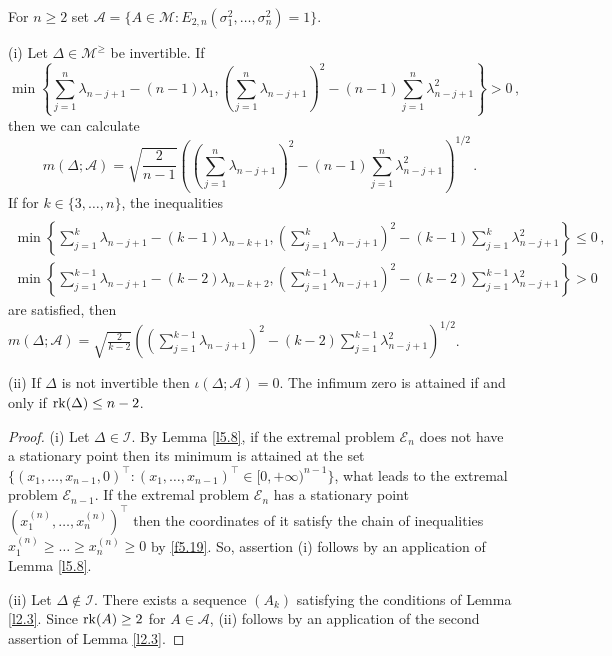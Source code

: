 \documentclass{amsart}
\begin{document}
For $n \geq 2$ set ${\mathcal A} = \{ A \in {\mathcal M}: E_{2,n}(\sigma_1^2, \ldots , \sigma_n^2)=1 \}$.                                    

\begin{pro} \label{p5.9}
(i) Let $\Delta \in {\mathcal M}^\geq$ be invertible. If 
\[
\min \left\{ \sum_{j=1}^n \lambda_{n-j+1} - (n-1)\lambda_1, \left( \sum_{j=1}^n \lambda_{n-j+1}\right)^2 - (n-1) \sum_{j=1}^n \lambda_{n-j+1}^2 \right\} >0\, ,
\]
 then we can calculate 
 \[
 m(\Delta ; {\mathcal A}) = \sqrt{\frac{2}{n-1}}  \left( \left( \sum_{j=1}^n \lambda_{n-j+1}\right)^2 - (n-1) \sum_{j=1}^n \lambda_{n-j+1}^2 \right)^{1/2} \, .
 \]
 If for $k \in \{ 3,\ldots,n \}$, the inequalities
   \begin{eqnarray}   \label{f5.23}
         & & \\
        \min \left\{ \sum_{j=1}^k \lambda_{n-j+1} - (k-1) \lambda_{n-k+1} , \left(\sum_{j=1}^k \lambda_{n-j+1}\right)^2 - (k-1) \sum_{j=1}^k \lambda_{n-j+1}^2 \right\} \leq 0 \, ,& &  \nonumber \\
        \min \left\{ \sum_{j=1}^{k-1} \lambda_{n-j+1} - (k-2) \lambda_{n-k+2} , \left(\sum_{j=1}^{k-1} \lambda_{n-j+1}\right)^2 - (k-2) \sum_{j=1}^{k-1} \lambda_{n-j+1}^2 \right\} > 0 &  & \nonumber
   \end{eqnarray}
   are satisfied, then $m(\Delta ; {\mathcal A}) = \sqrt{\frac{2}{k-2}}  \left( ( \sum_{j=1}^{k-1} \lambda_{n-j+1})^2 - (k-2) \sum_{j=1}^{k-1} \lambda_{n-j+1}^2 \right)^{1/2}$.
   
(ii) If $\Delta$ is not invertible then $\iota(\Delta ; {\mathcal A}) = 0$. The infimum zero is attained if and only if ${\rm rk}(\Delta) \leq n-2$. 
\end{pro}   

\begin{proof}
(i) Let $\Delta \in \mathcal I$. By Lemma \ref{l5.8}, if the extremal problem ${\mathcal E}_n$ does not have a stationary point then its minimum is attained at the set $\{ ( x_1,\ldots,x_{n-1},0)^\top : (x_1,\ldots,x_{n-1})^\top \in [0,+\infty)^{n-1} \}$, what leads to the extremal problem ${\mathcal E}_{n-1}$. If the extremal problem ${\mathcal E}_n$ has a stationary point $(x_1^{(n)} ,\ldots , x_n^{(n)})^\top$ then the coordinates of it satisfy the chain of inequalities $x_1^{(n)} \geq \ldots \geq x_n^{(n)} \geq 0$ by \eqref{f5.19}. So, assertion (i) follows by an application of Lemma \ref{l5.8}. 

(ii) Let $\Delta \not\in \mathcal I$. There exists a sequence $(A_k)$ satisfying the conditions of Lemma \ref{l2.3}. Since ${\rm rk}(A) \geq 2$ for $A \in \mathcal A$, (ii) follows by an application of the second assertion of Lemma \ref{l2.3}.
\end{proof}
\end{document}
